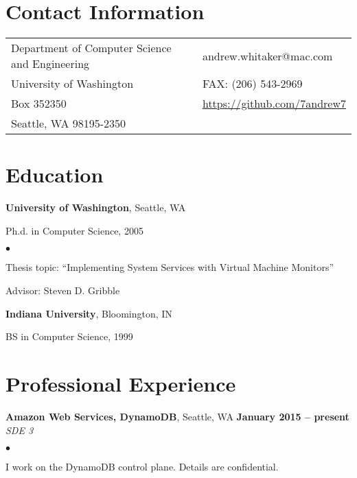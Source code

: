 \documentclass[margin,line]{res}
\newenvironment{list1}{
  \begin{list}{\ding{113}}{%
      \setlength{\itemsep}{0in}
      \setlength{\parsep}{0in} \setlength{\parskip}{0in}
      \setlength{\topsep}{0in} \setlength{\partopsep}{0in} 
      \setlength{\leftmargin}{0.17in}}}{\end{list}}
\newenvironment{list2}{
  \begin{list}{$\bullet$}{%
      \setlength{\itemsep}{0in}
      \setlength{\parsep}{0in} \setlength{\parskip}{0in}
      \setlength{\topsep}{0in} \setlength{\partopsep}{0in} 
      \setlength{\leftmargin}{0.2in}}}{\end{list}}
\begin{document}

\begin{resume}
\section{\sc Contact Information}
\vspace{.05in}
\begin{tabular}{@{}p{4in}p{2in}}
Department of Computer Science and Engineering & andrew.whitaker@mac.com \\
University of Washington &  FAX: (206) 543-2969  \\
Box 352350 & \url{https://github.com/7andrew7}        \\
Seattle, WA 98195-2350  \\
\end{tabular}

\section{\sc Education}
{\bf University of Washington}, Seattle, WA\\
\vspace*{-.1in}
\begin{list1}
\item[] Ph.d. in Computer Science, 2005
\begin{list2}
  \vspace*{.05in}
  \item Thesis topic: ``Implementing System Services with Virtual Machine Monitors''
  \item Advisor: Steven D. Gribble
\end{list2}
\end{list1}

{\bf Indiana University}, Bloomington, IN \\
\vspace*{-.1in}
\begin{list1}
\item[] BS in Computer Science, 1999
\end{list1}

\section{\sc Professional Experience}

\textbf{Amazon Web Services, DynamoDB}, Seattle, WA \hfill \textbf{January 2015 -- present} \\\vspace{-4mm}
\textsl{SDE 3} \\
\begin{list2}
\item I work on the DynamoDB control plane.  Details are confidential.
\end{list2}


\end{resume}
\end{document}
